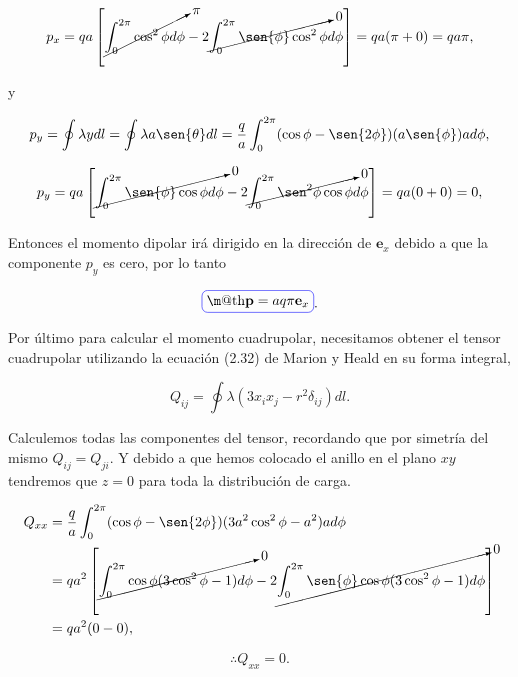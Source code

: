 \documentclass[a4paper,11pt]{article}
\makeatletter
\numberwithin{equation}{section}
\newcommand*{\boxcolor}{blue}
\renewcommand{\boxed}[1]{\textcolor{\boxcolor}{%
\tikz[baseline={([yshift=-1ex]current bounding box.center)}] \node [rectangle, minimum width=1ex,rounded corners,draw] {\normalcolor\m@th$\displaystyle#1$};}}
\makeatother
\begin{document}
\begin{equation}
 p_x = qa\left[\cancelto{\pi}{\int_0^{2\pi}\cos^2{\phi}d\phi} -
 2 \cancelto{0}{\int_0^{2\pi}\sen{\phi}\cos^2{\phi}} d\phi \right] = qa(\pi + 0) = qa\pi,
\end{equation}

y 

\begin{equation}
 p_y = \oint \lambda y dl = \oint \lambda a\sen{\theta} dl = 
 \frac{q}{a}\int_0^{2\pi} (\cos{\phi} - \sen{2\phi})(a\sen{\phi}) ad\phi,
\end{equation}

\begin{equation}
 p_y = qa\left[\cancelto{0}{\int_0^{2\pi}\sen{\phi}\cos{\phi}d\phi} -
 2 \cancelto{0}{\int_0^{2\pi}\sen^2{\phi}\cos{\phi}} d\phi \right] = qa(0 + 0) = 0,
\end{equation}

Entonces el momento dipolar irá dirigido en la dirección de $\mathbf{e}_x$ debido a 
que la componente $p_y$ es cero, por lo tanto 

\begin{equation}
 \boxed{\mathbf{p} = aq\pi\mathbf{e}_x}. 
\end{equation}

Por último para calcular el momento cuadrupolar, necesitamos obtener el tensor 
cuadrupolar utilizando la ecuación (2.32) de Marion y Heald \cite{marion2} en 
su forma integral, 

\begin{equation}
 Q_{ij} = \oint \lambda(3x_ix_j - r^2\delta_{ij})dl.
\end{equation}

Calculemos todas las componentes del tensor, recordando que por simetría del mismo 
$Q_{ij} = Q_{ji}$. Y debido a que hemos colocado el anillo en el plano $xy$ tendremos 
que $z=0$ para toda la distribución de carga. 

\begin{align*}
 Q_{xx} &= \frac{q}{a}\int_0^{2\pi} (\cos{\phi} - \sen{2\phi})(3a^2\cos^2{\phi} - 
 a^2)ad\phi \\
 &= qa^2\left[\cancelto{0}{\int_0^{2\pi}\cos{\phi}(3\cos^2{\phi} - 1)d\phi} - 
 2 \cancelto{0}{\int_0^{2\pi} \sen{\phi} \cos{\phi} (3\cos^2{\phi} - 1)d\phi}\right] \\
 &= qa^2 ( 0 - 0),
\end{align*}

\begin{equation}
 \therefore Q_{xx} = 0.
\end{equation}
\end{document}
